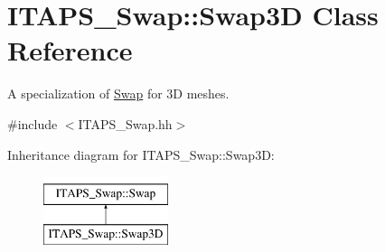 \hypertarget{class_i_t_a_p_s___swap_1_1_swap3_d}{
\section{ITAPS\_\-Swap::Swap3D Class Reference}
\label{class_i_t_a_p_s___swap_1_1_swap3_d}
}


A specialization of \hyperlink{class_i_t_a_p_s___swap_1_1_swap}{Swap} for 3D meshes.  




{\ttfamily \#include $<$ITAPS\_\-Swap.hh$>$}

Inheritance diagram for ITAPS\_\-Swap::Swap3D:\begin{figure}[H]
\begin{center}
\leavevmode
\includegraphics[height=2cm]{class_i_t_a_p_s___swap_1_1_swap3_d}
\end{center}
\end{figure}
